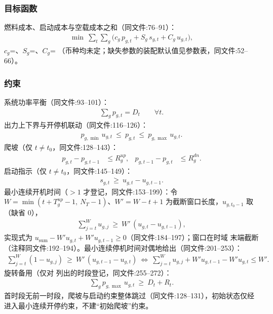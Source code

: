 \subsubsection*{目标函数}
燃料成本、启动成本与空载成本之和（同文件:76--91）：
\begin{align*}
\min\ \sum_{t}\sum_{g}\Big(c_g\,p_{g,t} + S_g\,s_{g,t} + C_g\,u_{g,t}\Big),
\end{align*}
$c_g$=、$S_g$=、$C_g$=
（币种均未定；缺失参数的装配默认值见参数表，同文件:52--66）。

\subsubsection*{约束}
系统功率平衡（同文件:93--101）：
\begin{align*}
\sum_{g} p_{g,t} = D_t \qquad \forall t .
\end{align*}
出力上下界与开停机联动（同文件:116--126）：
\begin{align*}
p_{g,\min}\,u_{g,t}\ \le\ p_{g,t}\ \le\ p_{g,\max}\,u_{g,t}.
\end{align*}
爬坡（仅 $t\ne t_0$，同文件:128--143）：
\begin{align*}
p_{g,t} - p_{g,t-1} &\le R^{up}_g, & p_{g,t-1} - p_{g,t} &\le R^{dn}_g .
\end{align*}
启动指示（仅 $t\ne t_0$，同文件:145--149）：
\begin{align*}
s_{g,t}\ \ge\ u_{g,t} - u_{g,t-1}.
\end{align*}
最小连续开机时间（$>1$ 才登记，同文件:153--199）：令
$W=\min(t+T^{up}_g-1,\ N_T-1)$、$W'=W-t+1$ 为截断窗口长度，$u_{g,t_0-1}$ 取
（缺省 0），
\begin{align*}
\sum_{j=t}^{W} u_{g,j}\ \ge\ W'\,(u_{g,t} - u_{g,t-1}),
\end{align*}
实现式为 $u_{\mathrm{sum}} - W'u_{g,t} + W'u_{g,t-1}\ge 0$（同文件:184--197）；窗口在时域
末端截断（注释同文件:192--194）。最小连续停机时间对偶地给出（同文件:201--253）：
\begin{align*}
\sum_{j=t}^{W} (1-u_{g,j})\ \ge\ W'\,(u_{g,t-1} - u_{g,t})
\ \Longleftrightarrow\
\sum_{j=t}^{W} u_{g,j} + W'u_{g,t-1} - W'u_{g,t} \le W' .
\end{align*}
旋转备用（仅对  列出的时段登记，同文件:255--272）：
\begin{align*}
\sum_{g} p_{g,\max}\,u_{g,t}\ \ge\ D_t + R_t .
\end{align*}
首时段无前一时段，爬坡与启动约束整体跳过（同文件:128--131），初始状态仅经
 进入最小连续开停约束，不建“初始爬坡”约束。

